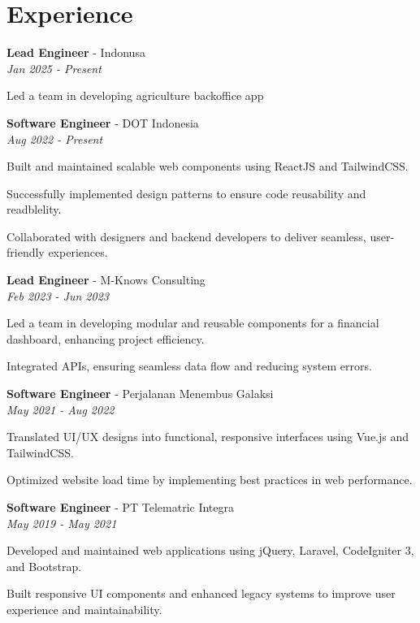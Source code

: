 \section*{Experience}

\textbf{Lead Engineer} - Indonusa \\
\textit{Jan 2025 - Present}
\begin{highlights}
    \item Led a team in developing agriculture backoffice app
\end{highlights}

\textbf{Software Engineer} - DOT Indonesia \\
\textit{Aug 2022 - Present}
\begin{highlights}
    \item Built and maintained scalable web components using ReactJS and TailwindCSS.
    \item Successfully implemented design patterns to ensure code reusability and readblelity.
    \item Collaborated with designers and backend developers to deliver seamless, user-friendly experiences.
\end{highlights}

\textbf{Lead Engineer} - M-Knows Consulting \\
\textit{Feb 2023 - Jun 2023}
\begin{highlights}
    \item Led a team in developing modular and reusable components for a financial dashboard, enhancing project efficiency.
    \item Integrated APIs, ensuring seamless data flow and reducing system errors.
\end{highlights}

\textbf{Software Engineer} - Perjalanan Menembus Galaksi \\
\textit{May 2021 - Aug 2022}
\begin{highlights}
    \item Translated UI/UX designs into functional, responsive interfaces using Vue.js and TailwindCSS.
    \item Optimized website load time by implementing best practices in web performance.
\end{highlights}

\textbf{Software Engineer} - PT Telematric Integra \\
\textit{May 2019 - May 2021}
\begin{highlights}
    \item Developed and maintained web applications using jQuery, Laravel, CodeIgniter 3, and Bootstrap.
    \item Built responsive UI components and enhanced legacy systems to improve user experience and maintainability.
\end{highlights}
